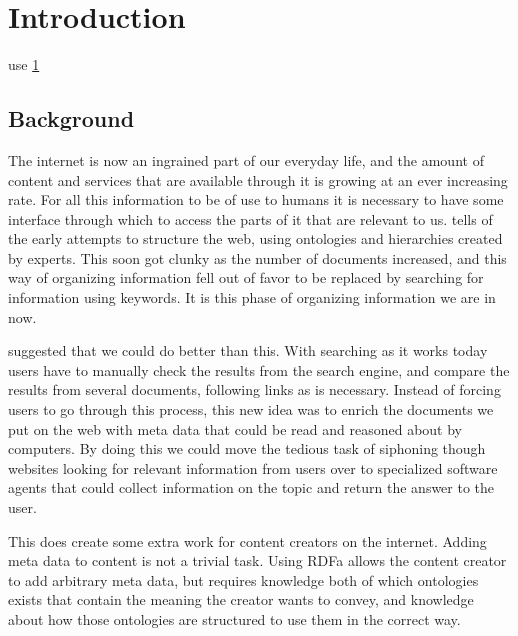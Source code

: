 
\chapter{Introduction} %

\label{Introduction} %
use \ref{Introduction}



\section{Background}
The internet is now an ingrained part of our everyday life, 
and the amount of content and services that are available through it is growing at an ever increasing rate. 
For all this information to be of use to humans it is necessary to have some interface through which to access the parts of it that are relevant to us. 
\citet{Shirky2007} tells of the early attempts to structure the web, 
using ontologies and hierarchies created by experts. 
This soon got clunky as the number of documents increased, 
and this way of organizing information fell out of favor to be replaced by searching for information using keywords. 
It is this phase of organizing information we are in now. 

\citet{Berners-Lee2001} suggested that we could do better than this. 
With searching as it works today users have to manually check the results from the search engine, 
and compare the results from several documents, following links as is necessary. 
Instead of forcing users to go through this process, 
this new idea was to enrich the documents we put on the web with meta data that could be read and reasoned about by computers. 
By doing this we could move the tedious task of siphoning though websites looking for relevant information from users 
over to specialized software agents that could collect information on the topic and return the answer to the user.

This does create some extra work for content creators on the internet.
Adding meta data to content is not a trivial task. 
Using RDFa allows the content creator to add arbitrary meta data, 
but requires knowledge both of which ontologies exists that contain the meaning the creator wants to convey,
and knowledge about how those ontologies are structured to use them in the correct way.


